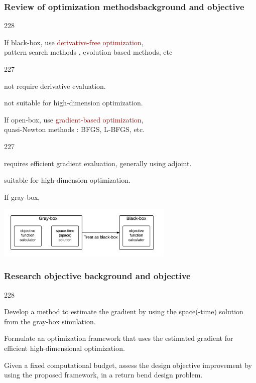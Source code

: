 \documentclass{beamer}
\let\oldcite=\cite
\renewcommand{\cite}[1]{\textcolor[rgb]{.4,.4,.85}{\oldcite{#1}}}
\newcommand{\barrow}{\item[\color{darkred}\ding{228}]}
\newcommand{\carrow}{\item[\color{darkred}\ding{227}]}
\begin{document}
\begin{frame}
    \frametitle{Review of optimization methods\hfill \scriptsize{background and objective}}\small
    \begin{dinglist}{228}
        \barrow If {black-box}, use \textcolor{darkred}{derivative-free optimization},\\
                \scriptsize{
                pattern search methods \cite{Tarma03}, evolution based methods\cite{Eberhart 10, Davis 10}, etc}
                \small
                \begin{dinglist}{227}
                    \carrow not require derivative evaluation.
                    \carrow not suitable for high-dimension optimization.
                \end{dinglist}
        \barrow If open-box, use \textcolor{darkred}{gradient-based optimization},\\
                \scriptsize
                quasi-Newton methods \cite{John 77}: BFGS, L-BFGS, etc.
                \small
                \begin{dinglist}{227}
                    \carrow requires efficient gradient evaluation, generally using adjoint.
                    \carrow suitable for high-dimension optimization.
                \end{dinglist}
        \barrow If gray-box,
    \end{dinglist}
    \begin{center}
        \includegraphics[height=2.5cm]{treat.png}
    \end{center}   
\end{frame}


\begin{frame}
    \frametitle{Research objective \hfill \scriptsize{background and objective}}\small
    \begin{dinglist}{228}
        \barrow Develop a method to estimate the gradient by using the space(-time) solution
                from the gray-box simulation.
        \vspace{.1cm}
        \barrow Formulate an optimization framework that uses the estimated gradient for efficient high-dimensional 
                optimization.
        \vspace{.1cm}
        \barrow Given a fixed computational budget, assess the design objective improvement 
                by using the proposed framework, in a return bend design problem.
    \end{dinglist}
\end{frame}
\end{document}
